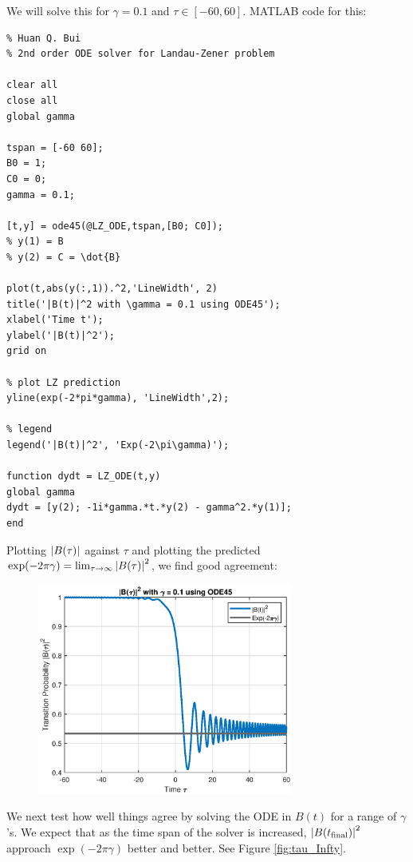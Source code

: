 \documentclass{book}
\theoremstyle{definition}
\begin{document}
We will solve this for $\gamma = 0.1$ and $\tau \in [-60, 60]$. MATLAB code for this: 
\begin{lstlisting}
% Huan Q. Bui
% 2nd order ODE solver for Landau-Zener problem

clear all
close all
global gamma

tspan = [-60 60];
B0 = 1;
C0 = 0;
gamma = 0.1;

[t,y] = ode45(@LZ_ODE,tspan,[B0; C0]);
% y(1) = B
% y(2) = C = \dot{B}

plot(t,abs(y(:,1)).^2,'LineWidth', 2)
title('|B(t)|^2 with \gamma = 0.1 using ODE45');
xlabel('Time t');
ylabel('|B(t)|^2');
grid on

% plot LZ prediction
yline(exp(-2*pi*gamma), 'LineWidth',2);

% legend
legend('|B(t)|^2', 'Exp(-2\pi\gamma)');

function dydt = LZ_ODE(t,y)
global gamma
dydt = [y(2); -1i*gamma.*t.*y(2) - gamma^2.*y(1)];
end

\end{lstlisting}



Plotting $\abs{B(\tau)}$ against $\tau$ and plotting the predicted $\exp(-2\pi \gamma) = \lim_{\tau\to\infty}\abs{B(\tau)}^2$, we find good agreement:
\begin{figure}[!htb]
	\centering
	\includegraphics[width=0.75\textwidth]{images/LZ}
\end{figure}


We next test how well things agree by solving the ODE in $B(t)$ for a range of $\gamma$'s. We expect that as the time span of the solver is increased, $\abs{B(t_{\text{final}})}^2$ approach $\exp(-2\pi \gamma)$ better and better. See Figure \ref{fig:tau_Infty}.
\end{document}
